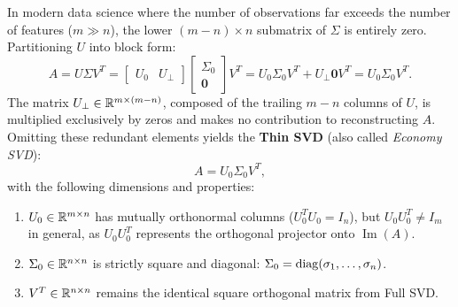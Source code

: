 In modern data science where the number of observations far exceeds the number of features ($m \gg n$), the lower $(m-n) \times n$ submatrix of $\Sigma$ is entirely zero. Partitioning $U$ into block form:
\begin{equation}
    A = U \Sigma V^T = \begin{bmatrix} U_0 & U_{\perp} \end{bmatrix} \begin{bmatrix} \Sigma_0 \\ \mathbf{0} \end{bmatrix} V^T = U_0 \Sigma_0 V^T + U_{\perp} \mathbf{0} V^T = U_0 \Sigma_0 V^T.
\end{equation}
The matrix $U_{\perp} \in \mathbb{R}^{m \times (m-n)}$, composed of the trailing $m-n$ columns of $U$, is multiplied exclusively by zeros and makes no contribution to reconstructing $A$.
Omitting these redundant elements yields the \textbf{Thin SVD} (also called \textit{Economy SVD}):
\begin{equation}
    A = U_0 \Sigma_0 V^T,
\end{equation}
with the following dimensions and properties:
\begin{enumerate}
    \item $U_0 \in \mathbb{R}^{m \times n}$ has mutually orthonormal columns ($U_0^T U_0 = I_n$), but $U_0 U_0^T \neq I_m$ in general, as $U_0 U_0^T$ represents the orthogonal projector onto $\operatorname{Im}(A)$.
    \item $\Sigma_0 \in \mathbb{R}^{n \times n}$ is strictly square and diagonal: $\Sigma_0 = \operatorname{diag}(\sigma_1, \dots, \sigma_n)$.
    \item $V^T \in \mathbb{R}^{n \times n}$ remains the identical square orthogonal matrix from Full SVD.
\end{enumerate}

